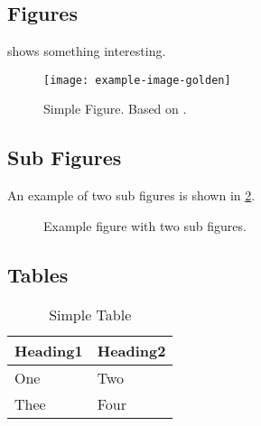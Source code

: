 \documentclass[sigconf,balance]{acmart}
\begin{document}
\subsection{Figures}

\begin{ltgexample}
 shows something interesting.

\begin{figure}
  \centering
  \texttt{[image: example-image-golden]}
  \caption[Simple Figure]{
    Simple Figure.
    Based on \citet{mwe}.
  }
  \label{fig:label}
\end{figure}
\end{ltgexample}

\subsection{Sub Figures}

An example of two sub figures is shown in \cref{fig:two_sub_figures}.

\begin{ltgexample}
\begin{figure}[!b]
  \centering
  \hfil
  \caption{Example figure with two sub figures.}
  \label{fig:two_sub_figures}
\end{figure}
\end{ltgexample}

\subsection{Tables}

\begin{ltgexample}
\begin{table}
  \caption{Simple Table}
  \label{tab:simple}
  \centering
  \begin{tabular}{ll}
    \toprule
    Heading1 & Heading2 \\
    \midrule
    One      & Two      \\
    Thee     & Four     \\
    \bottomrule
  \end{tabular}
\end{table}
\end{ltgexample}
\end{document}
